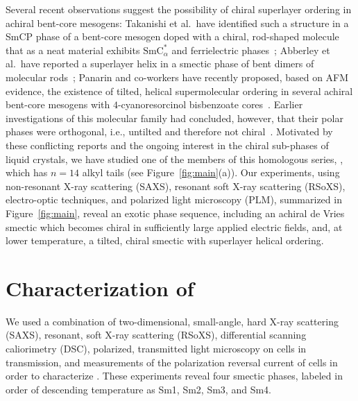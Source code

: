\documentclass[aagreenthesis]{subfiles}
\begin{document}
Several recent
observations suggest the possibility of chiral superlayer ordering in achiral
bent-core mesogens: Takanishi et al.\ have identified such a structure in a
SmCP phase of a bent-core mesogen doped with a chiral, rod-shaped molecule that as a neat
material exhibits $\mathrm{SmC}^*_\alpha$ and ferrielectric phases~\cite{takanishi2015chiral};
Abberley et al.\ have reported a superlayer helix in a smectic phase of bent dimers of molecular
rods~\cite{abberley2018heliconical}; Panarin and co-workers have recently proposed,
based on AFM
evidence, the existence of tilted, helical supermolecular ordering in several achiral bent-core mesogens with $4$-cyanoresorcinol bisbenzoate cores~\cite{sreenilayam_spontaneous_2016}.
Earlier investigations of this molecular family had concluded, however, that their polar phases were orthogonal, i.e.,  untilted and therefore not chiral~\cite{panarin_sequence_2011,sreenilayam_properties_2012}.
Motivated by these conflicting reports and the ongoing interest in the chiral sub-phases of liquid crystals, we have studied one of the members of this
homologous series, , which has $n = 14$ alkyl tails (see Figure~\ref{fig:main}(a)). Our experiments, using
non-resonant X-ray scattering (SAXS), resonant soft X-ray scattering (RSoXS), electro-optic techniques, and polarized light
microscopy (PLM), summarized in Figure~\ref{fig:main}, reveal an exotic phase sequence, including
an achiral de Vries smectic which becomes chiral in sufficiently large applied
electric fields, and, at lower temperature, a tilted, chiral smectic with superlayer helical
ordering.
\section{Characterization of \nfour{}}
We used a combination of two-dimensional, small-angle, hard X-ray scattering
(SAXS),  resonant, soft X-ray scattering (RSoXS), differential scanning
caliorimetry (DSC), polarized, transmitted light microscopy on cells in
transmission, and measurements of the polarization reversal current of cells in
order to characterize . These experiments reveal four smectic
phases, labeled in order of descending temperature as Sm1, Sm2, Sm3, and Sm4.
\end{document}

